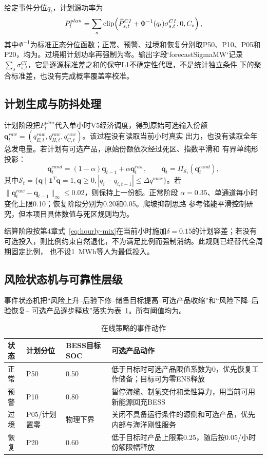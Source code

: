 给定事件分位$q_t$，计划源功率为
\begin{equation}
P_t^{plan}=\sum_s
\operatorname{clip}\!\left(
\widehat P_{s,t}^{CI}+\Phi^{-1}(q_t)\sigma_{s,t}^{CI},
0,C_s\right),
\label{eq:c5-risk-forecast}
\end{equation}
其中$\Phi^{-1}$为标准正态分位函数；正常、预警、过境和恢复分别取P50、P10、P05和
P20，均为\assumptiontag。过境期计划功率再强制为零。输出字段`forecastSigmaMW`记录
$\sum_s\sigma_{s,t}^{CI}$，它是逐源标准差之和的保守L1不确定性代理，不是统计独立条件
下的聚合标准差，也没有完成概率覆盖率校准。

\subsection{计划生成与防抖处理}

计划阶段把$P_t^{plan}$代入单小时V5经济调度，得到原始可选输入份额
$\bm q_t^{raw}=(q_{E,t}^{raw},q_{H,t}^{raw},q_{C,t}^{raw})$。该过程没有读取当前小时真实
出力，也没有读取全年总发电量。若计划有可选产品，原始份额依次经过死区、指数平滑和
有界单纯形投影：
\begin{equation}
\bm q_t^{cand}=(1-\alpha)\bm q_{t-1}+\alpha\bm q_t^{raw},
\qquad
\bm q_t=\Pi_{\mathcal S_t}(\bm q_t^{cand}),
\label{eq:c5-anti-jitter}
\end{equation}
其中$\mathcal S_t=\{\bm q\mid\bm 1^T\bm q=1,\bm q\ge0,
|q_i-q_{i,t-1}|\le\Delta q^{max}\}$。若
$\|\bm q_t^{raw}-\bm q_{t-1}\|_{\infty}\le0.02$，则保持上一份额。正常阶段
$\alpha=0.35$、单通道每小时变化上限0.10；恢复阶段分别为0.20和0.05。爬坡抑制思路
参考储能平滑控制研究\cite{teleke2010}，但本项目具体数值与死区规则均为\assumptiontag。

结算阶段按第4章式~\eqref{eq:hourly-mix}在当前小时施加$\delta=0.15$的计划容差；若没有
可选投入，则比例约束自然退化，不为满足比例而强制消纳。此规则已经替代全周期固定比例，
也不设1~MWh等人为最低投入。

\subsection{风险状态机与可靠性层级}

事件状态机把“风险上升--后验下修--储备目标提高--可选产品收缩”和“风险下降--后验恢复--
可选产品逐步释放”落实为表~\ref{tab:c5-event-policy}。所有阈值均为\assumptiontag。

\begin{table}[htbp]
\centering
\caption{在线策略的事件动作}
\label{tab:c5-event-policy}
\begin{tabularx}{\textwidth}{p{2.2cm}p{1.8cm}p{2.2cm}X}
\toprule
状态 & 计划分位 & BESS目标SOC & 可选产品动作\\
\midrule
正常 & P50 & 0.50 & 低于目标时可选产品限值系数为0，优先恢复工作储备；目标可为零ENS释放\\
预警 & P10 & 0.80 & 暂停海缆、制氢交付和柔性算力，用当前可用新能源回充BESS\\
过境 & P05/计划置零 & 物理下界 & 关闭不具备运行条件的源侧和可选产品，优先内部与海洋刚性服务\\
恢复 & P20 & 0.60 & 低于目标时产品上限乘0.25，随后按0.05/小时份额限幅释放\\
\bottomrule
\end{tabularx}
\end{table}

